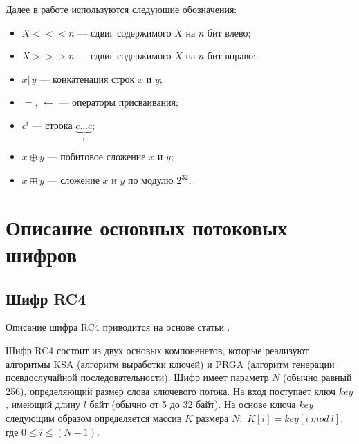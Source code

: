 \documentclass{./civarticle}
\begin{document}
Далее в работе используются следующие обозначения:
\begin{itemize}
    \item $X <<< n$ --- сдвиг содержимого $X$ на $n$ бит влево;
    \item $X >>> n$ --- сдвиг содержимого $X$ на $n$ бит вправо;
    \item $x \mathbin\Vert y$ --- конкатенация строк $x$ и $y$;
    \item $=$, $\leftarrow$ --- операторы присваивания;
    \item $c^i$ --- строка $\underbrace{c...c}_{i}$;
    \item $x \oplus y$ --- побитовое сложение $x$ и $y$;
    \item $x \boxplus y$ --- сложение $x$ и $y$ по модулю $2^{32}$.
\end{itemize}

\section{Описание основных потоковых шифров}
\subsection{Шифр RC4}
Описание шифра RC4 приводится на основе статьи \cite{rc4}.

Шифр RC4 состоит из двух основых компоненетов, которые реализуют алгоритмы KSA (алгоритм выработки ключей) и PRGA (алгоритм генерации псевдослучайной последовательности). Шифр имеет параметр $N$ (обычно равный 256), определяющий размер слова ключевого потока. На вход поступает ключ $key$, имеющий длину $l$ байт (обычно от 5 до 32 байт). На основе ключа $key$ следующим образом определяется массив $K$ размера $N$:~$K[i] = key[i~mod~l]$, где $0 \leq i \leq (N - 1)$. 
\end{document}
